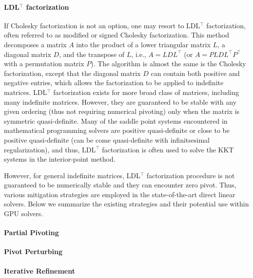 \documentclass{article}
\begin{document}
\paragraph{LDL$^\top$ factorization}
If Cholesky factorization is not an option, one may resort to LDL$^\top$ factorization, often referred to as modified or signed Cholesky factorization.
This method decomposes a matrix $A$ into the product of a lower triangular matrix $L$, a diagonal matrix $D$, and the transpose of $L$, i.e., $A = L D L^\top$ (or $A = P L D L^\top P^\top$ with a permutation matrix $P$).
The algorithm is almost the same is the Cholesky factorization, except that the diagonal matrix $D$ can contain both positive and negative entries, which allows the factorization to be applied to indefinite matrices.
LDL$^\top$ factorization exists for more broad class of matrices, including many indefinite matrices.
However, they are guaranteed to be stable with any given ordering (thus not requiring numerical pivoting) only when the matrix is symmetric quasi-definite.
Many of the saddle point systems encountered in mathematical programming solvers are positive quasi-definite or close to be positive quasi-definite (can be come quasi-definite with infinitsesimal regularization), and thus, LDL$^\top$ factorization is often used to solve the KKT systems in the interior-point method.

However, for general indefinite matrices, LDL$^\top$ factorization procedure is not guaranteed to be numerically stable and they can encounter zero pivot.
Thus, various mitigation strategies are employed in the state-of-the-art direct linear solvers.
Below we summarize the existing strategies and their potential use within GPU solvers.
\paragraph{Partial Pivoting}
\paragraph{Pivot Perturbing}
\paragraph{Iterative Refinement}

\end{document}
